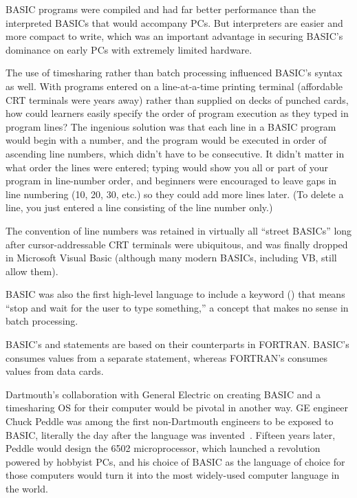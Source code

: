 \begin{tangent}
  BASIC programs were compiled and had
  far better performance than the interpreted BASICs that would
  accompany PCs. But interpreters are easier and more compact to write, which
  was an important advantage in securing BASIC's dominance on
  early PCs with extremely limited hardware.
\end{tangent}


The use of timesharing rather than batch processing influenced
BASIC's syntax as well.
With programs entered on a line-at-a-time printing terminal (affordable CRT
terminals were years away) rather than supplied on decks of punched
cards, how could learners easily specify the order of program execution
as they typed in program lines?
The ingenious solution was that each line in a BASIC
program would begin with a number, and the program would be
executed in order of ascending line numbers, which didn't have to be
consecutive.  
It didn't matter in what order the lines were entered;
typing  would show
you all or part of your program in line-number order,
and beginners were encouraged to leave gaps in line
numbering (10, 20, 30, etc.) so they could add
more lines later.  (To delete a line, you just entered a line
consisting of the line number only.)

  \begin{tangent}
  The convention of line numbers was retained in virtually all ``street
  BASICs'' long after cursor-addressable CRT terminals were ubiquitous,
  and was finally dropped in Microsoft Visual Basic (although many modern
  BASICs, including VB, still allow them).
  \end{tangent}

BASIC was also the first high-level language to include a keyword
() that means ``stop and wait for
the user to type something,'' a concept that makes no sense in batch
processing. 

  \begin{tangent}
  BASIC's  and  statements are based on their
  counterparts in FORTRAN.  BASIC's  consumes values from a
  separate  statement, whereas FORTRAN's  consumes
  values from data cards.
  \end{tangent}

Dartmouth's  collaboration with General Electric on creating BASIC and a
timesharing OS for their computer would be pivotal in another way.
GE engineer Chuck Peddle was among the first non-Dartmouth engineers to
be exposed to
BASIC, literally the day after the language was
invented~\cite[p.~5]{commodore}.
Fifteen years later, Peddle would design the 6502 microprocessor, which launched
a revolution powered by hobbyist PCs, and his choice of BASIC as the
language of choice for those computers would turn it into the most
widely-used computer language in the world.


